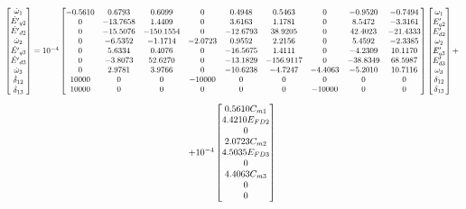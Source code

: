 \documentclass[Lau,noexaminfo]{sapthesis}
\begin{document}
	\begin{equation*}
	\centering
	\resizebox{1.04\hsize}{!}{$%
	\begin{bmatrix}
	\dot{\omega}_1\\
	\dot{E'}_{q2}\\
	\dot{E'}_{d2}\\
	\dot{\omega}_2\\
	\dot{E'}_{q3}\\
	\dot{E'}_{d3}\\
	\dot{\omega}_3\\
	\dot{\delta}_{12}\\
	\dot{\delta}_{13}
	\end{bmatrix}=10^{-4}
	\begin{bmatrix}
	-0.5610 & 0.6793 & 0.6099 & 0 & 0.4948 & 0.5463 & 0 & -0.9520 & -0.7494\\
	0 & -13.7658 & 1.4409 & 0 & 3.6163 & 1.1781 & 0 & 8.5472 & -3.3161\\
	0 & -15.5076 & -150.1554 & 0 & -12.6793 & 38.9205 & 0 & 42.4023 & -21.4333\\
	0 & -6.5352 & -1.1714 & -2.0723 & 0.9552 & 2.2156 & 0 & 5.4592 & -2.3385\\
	0 & 5.6334 & 0.4076 & 0 & -16.5675 & 1.4111 & 0 & -4.2309 & 10.1170\\
	0 & -3.8073 & 52.6270 & 0 & -13.1829 & -156.9117 & 0 & -38.8349 & 68.5987\\
	0 & 2.9781 & 3.9766 & 0 & -10.6238 & -4.7247 & -4.4063 & -5.2010 & 10.7116\\
	10000 & 0 & 0 & -10000 & 0 & 0 & 0 & 0 & 0\\
	10000 & 0 & 0 & 0 & 0 & 0 & -10000 & 0 & 0
	\end{bmatrix}
	\begin{bmatrix}
	\omega_1\\
	E'_{q2}\\
	E'_{d2}\\
	\omega_2\\
	E'_{q3}\\
	E'_{d3}\\
	\omega_3\\
	\delta_{12}\\
	\delta_{13}
	\end{bmatrix}+$%
	}%
	\end{equation*}
	\begin{align*}
	\resizebox{0.2\hsize}{!}{$%
	+10^{-4}\begin{bmatrix}
	0.5610C_{m1}\\
	4.4210E_{FD2}\\
	0\\
	2.0723C_{m2}\\
	4.5035E_{FD3}\\
	0\\
	4.4063C_{m3}\\
	0\\
	0
	\end{bmatrix}$%
	}%
	\end{align*}
\end{document}
